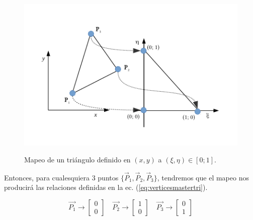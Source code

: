 \begin{figure}
\centering
\includegraphics[scale=.8]{Triangulo.pdf}
\caption{\label{fig:tri} } Mapeo de un triángulo definido en $(x,y)$ a $(\xi, \eta) \in [0; 1]$.
\end{figure}

 Entonces, para cualesquiera 3 puntos $ \lbrace \vec{P}_{1}, \vec{P}_{2}, \vec{P}_{3}  \rbrace $, tendremos que el mapeo nos producirá las relaciones definidas en la ec. (\ref{eq:verticesmastertri}).

\begin{equation}
  \label{eq:verticesmastertri}
  \vec{P_1} \rightarrow 
  \begin{bmatrix}
    0\\ 
    0
  \end{bmatrix}\quad \vec{P_2} \rightarrow
  \begin{bmatrix}
    1\\
    0
  \end{bmatrix}\quad \vec{P_3} \rightarrow
  \begin{bmatrix}
    0\\
    1
  \end{bmatrix}
\end{equation}

